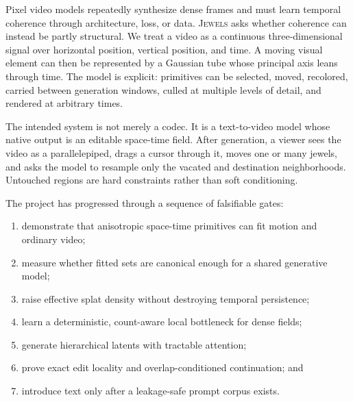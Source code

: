 \documentclass[10pt]{article}
\newcommand{\jewels}{\textsc{Jewels}}
\begin{document}
Pixel video models repeatedly synthesize dense frames and must learn temporal coherence through
architecture, loss, or data. \jewels{} asks whether coherence can instead be partly structural. We
treat a video as a continuous three-dimensional signal over horizontal position, vertical position,
and time. A moving visual element can then be represented by a Gaussian tube whose principal axis
leans through time. The model is explicit: primitives can be selected, moved, recolored, carried
between generation windows, culled at multiple levels of detail, and rendered at arbitrary times.

The intended system is not merely a codec. It is a text-to-video model whose native output is an
editable space-time field. After generation, a viewer sees the video as a parallelepiped, drags a
cursor through it, moves one or many jewels, and asks the model to resample only the vacated and
destination neighborhoods. Untouched regions are hard constraints rather than soft conditioning.

The project has progressed through a sequence of falsifiable gates:

\begin{enumerate}
  \item demonstrate that anisotropic space-time primitives can fit motion and ordinary video;
  \item measure whether fitted sets are canonical enough for a shared generative model;
  \item raise effective splat density without destroying temporal persistence;
  \item learn a deterministic, count-aware local bottleneck for dense fields;
  \item generate hierarchical latents with tractable attention;
  \item prove exact edit locality and overlap-conditioned continuation; and
  \item introduce text only after a leakage-safe prompt corpus exists.
\end{enumerate}
\end{document}

